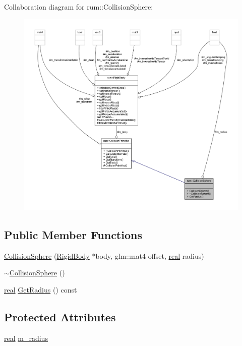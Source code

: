 Collaboration diagram for rum\+:\+:Collision\+Sphere\+:\nopagebreak
\begin{figure}[H]
\begin{center}
\leavevmode
\includegraphics[width=350pt]{classrum_1_1_collision_sphere__coll__graph}
\end{center}
\end{figure}
\subsection*{Public Member Functions}
\begin{DoxyCompactItemize}
\item 
\hyperlink{classrum_1_1_collision_sphere_abdd9300c4f88d40d1b131cfcae6b94df}{Collision\+Sphere} (\hyperlink{classrum_1_1_rigid_body}{Rigid\+Body} $\ast$body, glm\+::mat4 offset, \hyperlink{namespacerum_a7e8cca23573d5eaead0f138cbaa4862c}{real} radius)
\item 
\hyperlink{classrum_1_1_collision_sphere_a6e3be5263f114a38ecb3bbf9b97ba8df}{$\sim$\+Collision\+Sphere} ()
\item 
\hyperlink{namespacerum_a7e8cca23573d5eaead0f138cbaa4862c}{real} \hyperlink{classrum_1_1_collision_sphere_a766fafc15150c2b14f2545c2401f35e1}{Get\+Radius} () const
\end{DoxyCompactItemize}
\subsection*{Protected Attributes}
\begin{DoxyCompactItemize}
\item 
\hyperlink{namespacerum_a7e8cca23573d5eaead0f138cbaa4862c}{real} \hyperlink{classrum_1_1_collision_sphere_a191922b8ffb7ea87aa1caf915c563aad}{m\+\_\+radius}
\end{DoxyCompactItemize}
